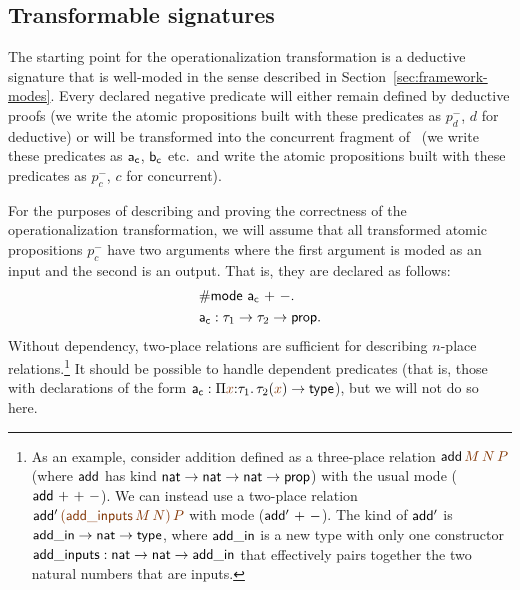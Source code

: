 \subsection{Transformable signatures}
\label{sec:trans-subset}

The starting point for the operationalization transformation is a
deductive signature that is well-moded in the sense described in
Section~\ref{sec:framework-modes}. Every declared negative predicate
will either remain defined by deductive proofs (we write the atomic
propositions built with these predicates as $p_d^-$, $d$ for
deductive) or will be transformed into the concurrent fragment of
\sls~(we write these predicates as ${\sf a_c}$, ${\sf b_c}$ etc.~and
write the atomic propositions built with these predicates as $p_c^-$,
$c$ for concurrent).

For the purposes of describing and proving the correctness of the
operationalization transformation, we will assume that all transformed
atomic propositions $p_c^-$ have two arguments where the first
argument is moded as an input and the second is an output. That is,
they are declared as follows:
\begin{align*}
& {\sf \#mode~a_c~{+}~{-}}.\\
& {\sf a_c} : \tau_1 \rightarrow \tau_2 \rightarrow {\sf prop}.
\end{align*}
Without dependency, two-place relations are sufficient for describing
$n$-place relations.\footnote{As an example, consider addition
   defined as a three-place relation ${\sf
    add}\,\lf{M}\,\lf{N}\,\lf{P}$ (where ${\sf add}$ has kind ${\sf
    nat} \rightarrow {\sf nat} \rightarrow {\sf nat} \rightarrow {\sf
    prop}$) with the usual mode (${\sf add}~{+}~{+}~{-}$). We can
  instead use a two-place relation ${\sf add'}\,\lf{({\sf
      add\_inputs}\,M\,N)}\,\lf{P}$ with mode (${\sf add'}~{+}~{-}$). The
  kind of ${\sf add'}$ is ${\sf add\_in} \rightarrow {\sf nat}
  \rightarrow {\sf type}$, where ${\sf add\_in}$ is a new type with
  only one constructor ${\sf add\_inputs} : {\sf nat} \rightarrow {\sf nat}
  \rightarrow {\sf add\_in}$ that effectively pairs together the two natural
  numbers that are inputs.}  It should be possible to handle dependent predicates
(that is, those with declarations of the form ${\sf a_c} : \Pi
\lf{x}{:}\tau_1.\,\tau_2(\lf{x}) \rightarrow {\sf type}$), but we will not do so
here.

